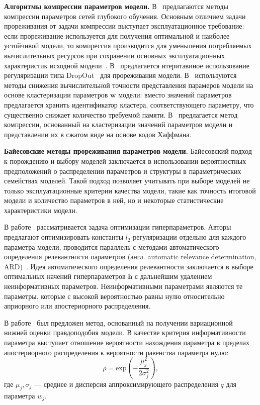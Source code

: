 \textbf{Алгоритмы компрессии параметров модели.}
В~\cite{weight_quantization, weight_quantization2,nvidia_prune} предлагаются методы компрессии параметров сетей глубокого обучения. Основным отличием задачи прореживания от задачи компрессии выступает эксплуатационное требование: если прореживание используется для получения оптимальной и наиболее устойчивой модели, то компрессия производится для уменьшения потребляемых вычислительных ресурсов при сохранении основных эксплуатационных характеристик исходной модели~\cite{weight_quantization2}.
В~\cite{nvidia_prune}
предлагается итеритавиное использование регуляризации типа DropOut~\cite{dropout} для прореживания модели. 
В~\cite{weight_quantization, weight_quantization2} используются методы снижения вычислительной точности представления парамеров модели на основе кластеризации параметров $\mathbf{w}$ модели: вместо значений параметров предлагается хранить идентификатор кластера, соответствующего параметру, что существенно снижает количество требуемой памяти.
В~\cite{weight_quantization2} предлагается метод компрессии, основанный на кластеризации значений параметров модели и представлении их в сжатом виде на основе кодов Хаффмана.

\textbf{Байесовские методы прореживания параметров модели. }
Байесовский подход к порождению и выбору моделей заключается в использовании вероятностных предположений о распределении параметров и структуры в параметрических семействах моделей. Такой подход позволяет учитывать при выборе моделей не только эксплуатационные критерии качества модели, такие как точность итоговой модели и количество параметров в ней, но и некоторые статистические характеристики модели. 

В работе~\cite{hyper} рассматривается задача оптимизации гиперпараметров.  Авторы предлагают оптимизировать константы $l_2$-регуляризации отдельно для каждого параметра модели, проводится параллель с методами автоматического определения релевантности параметров (англ. automatic relevance determination, ARD)~\cite{mackay}. 
Идея автоматического определения релевантности заключается в выборе оптимальных начений гиперпараметров $\mathbf{h}$ с дальнейшим удалением неинформативных параметров. Неинформативными параметрами являются те параметры, которые с высокой вероятностью равны нулю относительно априорного или апостериорного распределения.

В работе~\cite{nips} был предложен метод, основанный на получении вариационной нижней оценки правдоподобия модели. В качестве критерия информативности параметра выступает отношение вероятности нахождения параметра в пределах апостериорного распределения к вероятности равенства параметра нулю:
\begin{equation}
\label{eq:rho_graves}
   \rho =  \text{exp}\left(-\frac{\mu^2_j}{2\sigma^2_j}\right),  
\end{equation}
где $\mu_j, \sigma_j$ --- среднее и дисперсия аппроксимирующего распределения $q$ для параметра $w_j$.


